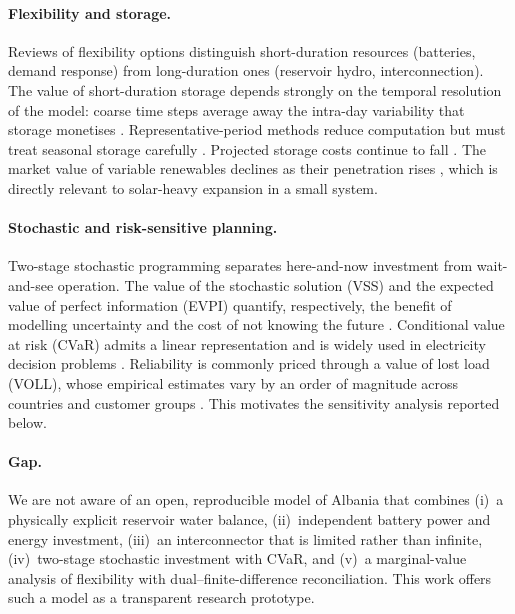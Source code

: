 \paragraph{Flexibility and storage.}
Reviews of flexibility options \cite{lund2015flexibility,kondziella2016flexibility} distinguish short-duration
resources (batteries, demand response) from long-duration ones (reservoir hydro, interconnection). The value
of short-duration storage depends strongly on the temporal resolution of the model: coarse time steps average
away the intra-day variability that storage monetises \cite{poncelet2016temporal}. Representative-period
methods reduce computation but must treat seasonal storage carefully \cite{kotzur2018seasonal}. Projected
storage costs continue to fall \cite{schmidt2019storage}. The market value of variable renewables declines as
their penetration rises \cite{hirth2013market}, which is directly relevant to solar-heavy expansion in a
small system.

\paragraph{Stochastic and risk-sensitive planning.}
Two-stage stochastic programming \cite{birge2011stochastic} separates here-and-now investment from
wait-and-see operation. The value of the stochastic solution (VSS) and the expected value of perfect
information (EVPI) quantify, respectively, the benefit of modelling uncertainty and the cost of not knowing
the future \cite{birge2011stochastic,madansky1960inequalities}. Conditional value at risk (CVaR) admits a
linear representation \cite{rockafellar2000cvar,rockafellar2002cvar} and is widely used in electricity
decision problems \cite{conejo2010decision}. Reliability is commonly priced through a value of lost load
(VOLL), whose empirical estimates vary by an order of magnitude across countries and customer groups
\cite{schroder2015voll}. This motivates the sensitivity analysis reported below.

\paragraph{Gap.}
We are not aware of an open, reproducible model of Albania that combines (i)~a physically explicit reservoir
water balance, (ii)~independent battery power and energy investment, (iii)~an interconnector that is limited
rather than infinite, (iv)~two-stage stochastic investment with CVaR, and (v)~a marginal-value analysis of
flexibility with dual--finite-difference reconciliation. This work offers such a model as a transparent
research prototype.
